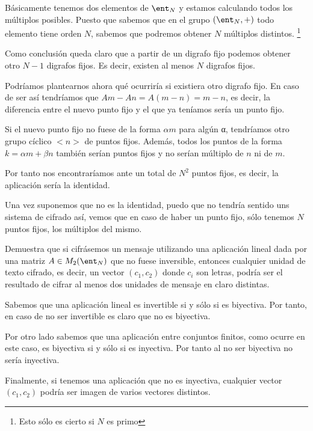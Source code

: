 \begin{problem}[8]
Básicamente tenemos dos elementos de $\ent_N$ y estamos calculando todos los múltiplos posibles. Puesto que sabemos que en el grupo $(\ent_N,+)$ todo elemento tiene orden $N$, sabemos que podremos obtener $N$ múltiplos distintos. \footnote{Esto sólo es cierto si $N$ es primo}

Como conclusión queda claro que a partir de un digrafo fijo podemos obtener otro $N-1$ digrafos fijos. Es decir, existen al menos $N$ digrafos fijos.

Podríamos plantearnos ahora qué ocurriría si existiera otro digrafo fijo. En caso de ser así tendríamos que $Am - An = A(m-n)=m-n$, es decir, la diferencia entre el nuevo punto fijo y el que ya teníamos sería un punto fijo.

Si el nuevo punto fijo no fuese de la forma $αm$ para algún α, tendríamos otro grupo cíclico $<n>$ de puntos fijos. Además, todos los puntos de la forma $k = αm+βn$ también serían puntos fijos y no serían múltiplo de $n$ ni de $m$.

Por tanto nos encontraríamos ante un total de $N^2$ puntos fijos, es decir, la aplicación sería la identidad.

Una vez suponemos que no es la identidad, puedo que no tendría sentido uns sistema de cifrado así, vemos que en caso de haber un punto fijo, sólo tenemos $N$ puntos fijos, los múltiplos del mismo.


\end{problem}

\begin{problem}[9]
Demuestra que si cifrásemos un mensaje utilizando una aplicación lineal dada por una matriz $A \in M_2 (\ent_N)$ que no fuese inversible, entonces cualquier unidad de texto cifrado, es decir, un vector $(c_1,c_2)$ donde $c_i$ son letras, podría ser el resultado de cifrar al menos dos unidades de mensaje en claro distintas.

\solution
{}

Sabemos que una aplicación lineal es invertible si y sólo si es biyectiva. Por tanto, en caso de no ser invertible es claro que no es biyectiva.

Por otro lado sabemos que una aplicación entre conjuntos finitos, como ocurre en este caso, es biyectiva si y sólo si es inyectiva. Por tanto al no ser biyectiva no sería inyectiva.

Finalmente, si tenemos una aplicación que no es inyectiva, cualquier vector $(c_1,c_2)$ podría ser imagen de varios vectores distintos.

\end{problem}

